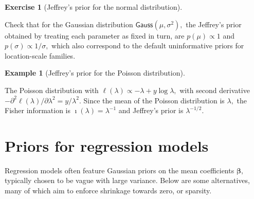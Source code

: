 \documentclass[
  11pt,
  letterpaper,
]{scrbook}
\theoremstyle{definition}
\newtheorem{example}{Example}[chapter]
\theoremstyle{plain}
\theoremstyle{plain}
\theoremstyle{plain}
\theoremstyle{definition}
\newtheorem{exercise}{Exercise}[chapter]
\theoremstyle{definition}
\theoremstyle{plain}
\theoremstyle{plain}
\theoremstyle{remark}
\begin{document}
\begin{exercise}[Jeffrey's prior for the normal
distribution]\protect\hypertarget{exr-jeffreysnormal}{}\label{exr-jeffreysnormal}

Check that for the Gaussian distribution
\(\mathsf{Gauss}(\mu, \sigma^2),\) the Jeffrey's prior obtained by
treating each parameter as fixed in turn, are \(p(\mu) \propto 1\) and
\(p(\sigma) \propto 1/\sigma,\) which also correspond to the default
uninformative priors for location-scale families.

\end{exercise}

\begin{example}[Jeffrey's prior for the Poisson
distribution]\protect\hypertarget{exm-jeffreyspoisson}{}\label{exm-jeffreyspoisson}

The Poisson distribution with
\(\ell(\lambda) \propto -\lambda + y\log \lambda,\) with second
derivative
\(-\partial^2 \ell(\lambda)/\partial \lambda^2 = y/\lambda^2.\) Since
the mean of the Poisson distribution is \(\lambda,\) the Fisher
information is \(\imath(\lambda) = \lambda^{-1}\) and Jeffrey's prior is
\(\lambda^{-1/2}.\)

\end{example}

\section{Priors for regression
models}\label{priors-for-regression-models}

Regression models often feature Gaussian priors on the mean coefficients
\(\boldsymbol{\beta},\) typically chosen to be vague with large
variance. Below are some alternatives, many of which aim to enforce
shrinkage towards zero, or sparsity.
\end{document}
